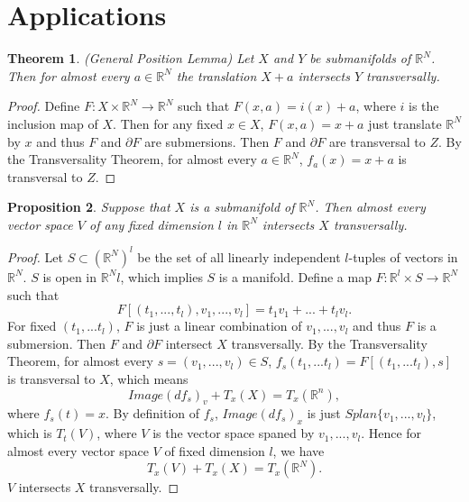 \documentclass[psamsfonts]{amsart}
\newtheorem{theorem}{Theorem}[section]
\newtheorem{prop}[theorem]{Proposition}
\theoremstyle{definition}
\theoremstyle{remark}
\numberwithin{equation}{section}
\begin{document}
	\section{Applications}
	\begin{theorem}(General Position Lemma)
		Let $X$ and $Y$ be submanifolds of $\mathbb{R}^N$. Then for almost every $a \in \mathbb{R}^N$ the translation $X + a$ intersects $Y$ transversally.
	\end{theorem}
	\begin{proof}
		Define $F: X \times \mathbb{R}^N \to \mathbb{R}^N$ such that $F(x,a) = i(x) + a$, where $i$ is the inclusion map of $X$. Then for any fixed $x \in X$, $F(x,a) = x + a$ just translate $\mathbb{R}^N$ by $x$ and thus $F$ and $\partial F$ are submersions. Then $F$ and $\partial F$ are transversal to $Z$. By the Transversality Theorem, for almost every $a \in \mathbb{R}^N$, $f_a(x) = x+a$ is transversal to $Z$.
	\end{proof}
	
	\begin{prop}
		Suppose that $X$ is a submanifold of $\mathbb{R}^N$. Then almost every vector space $V$ of any fixed dimension $l$ in $\mathbb{R}^N$ intersects $X$ transversally.
	\end{prop}
	\begin{proof}
		Let $S \subset (\mathbb{R}^N)^l$ be the set of all linearly independent $l$-tuples of vectors in $\mathbb{R}^N$. $S$ is open in $\mathbb{R}^Nl$, which implies $S$ is a manifold. Define a map $F: \mathbb{R}^l \times S \to \mathbb{R}^N$ such that
		\begin{equation}
			F[(t_1,...,t_l),v_1,...,v_l] = t_1v_1 + ... + t_lv_l.
		\end{equation}
		For fixed $(t_1,...t_l)$, $F$ is just a linear combination of $v_1,...,v_l$ and thus $F$ is a submersion. Then $F$ and $\partial F$ intersect $X$ transversally. By the Transversality Theorem, for almost every $s=(v_1,...,v_l) \in S$, $f_s(t_1,...t_l) = F[(t_1,...t_l),s]$ is transversal to $X$, which means
		\begin{equation}
			Image(df_s)_v + T_x(X) = T_x(\mathbb{R}^n),
		\end{equation}
		where $f_s(t) = x$. By definition of $f_s$, $Image(df_s)_x$ is just $Splan\{ v_1,...,v_l \}$, which is $T_t(V)$, where $V$ is the vector space spaned by $v_1,...,v_l$. Hence for almost every vector space $V$ of fixed dimension $l$, we have 
		\begin{equation}
			T_x(V) + T_x(X) = T_x(\mathbb{R}^N).
		\end{equation}
		$V$ intersects $X$ transversally.
	\end{proof}
	
\end{document}
